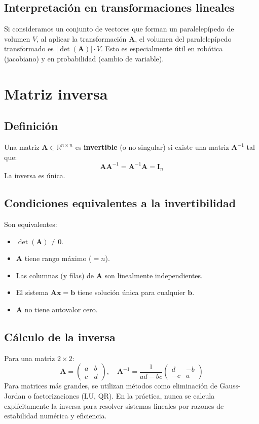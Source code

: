 \documentclass[12pt,a4paper,openany,oneside]{book}
\begin{document}
\subsection{Interpretación en transformaciones lineales}
Si consideramos un conjunto de vectores que forman un paralelepípedo de volumen $V$, al aplicar la transformación $\mathbf{A}$, el volumen del paralelepípedo transformado es $|\det(\mathbf{A})| \cdot V$. Esto es especialmente útil en robótica (jacobiano) y en probabilidad (cambio de variable).

\section{Matriz inversa}

\subsection{Definición}
Una matriz $\mathbf{A} \in \mathbb{R}^{n \times n}$ es \textbf{invertible} (o no singular) si existe una matriz $\mathbf{A}^{-1}$ tal que:
\[
\mathbf{A}\mathbf{A}^{-1} = \mathbf{A}^{-1}\mathbf{A} = \mathbf{I}_n
\]
La inversa es única.

\subsection{Condiciones equivalentes a la invertibilidad}
Son equivalentes:
\begin{itemize}
    \item $\det(\mathbf{A}) \neq 0$.
    \item $\mathbf{A}$ tiene rango máximo ($= n$).
    \item Las columnas (y filas) de $\mathbf{A}$ son linealmente independientes.
    \item El sistema $\mathbf{A}\mathbf{x} = \mathbf{b}$ tiene solución única para cualquier $\mathbf{b}$.
    \item $\mathbf{A}$ no tiene autovalor cero.
\end{itemize}

\subsection{Cálculo de la inversa}
Para una matriz $2\times 2$:
\[
\mathbf{A} = \begin{pmatrix} a & b \\ c & d \end{pmatrix}, \quad \mathbf{A}^{-1} = \frac{1}{ad-bc} \begin{pmatrix} d & -b \\ -c & a \end{pmatrix}
\]
Para matrices más grandes, se utilizan métodos como eliminación de Gauss-Jordan o factorizaciones (LU, QR). En la práctica, nunca se calcula explícitamente la inversa para resolver sistemas lineales por razones de estabilidad numérica y eficiencia.
\end{document}
